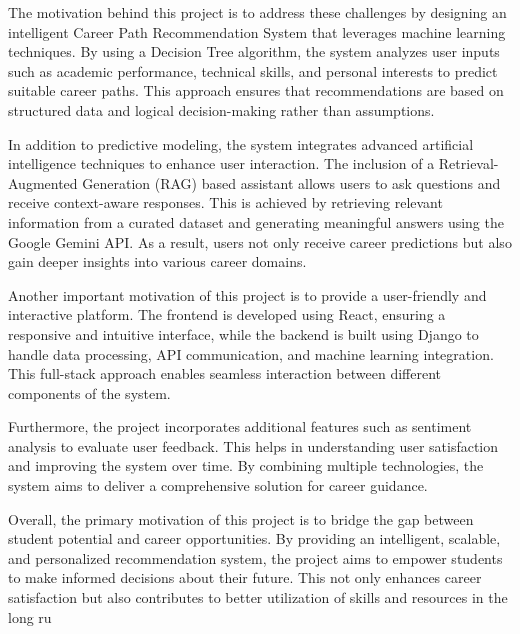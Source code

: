 \documentclass[12pt,a4paper]{report}
\begin{document}
{The motivation behind this project is to address these challenges by designing an intelligent Career Path Recommendation System that leverages machine learning techniques. By using a Decision Tree algorithm, the system analyzes user inputs such as academic performance, technical skills, and personal interests to predict suitable career paths. This approach ensures that recommendations are based on structured data and logical decision-making rather than assumptions.

In addition to predictive modeling, the system integrates advanced artificial intelligence techniques to enhance user interaction. The inclusion of a Retrieval-Augmented Generation (RAG) based assistant allows users to ask questions and receive context-aware responses. This is achieved by retrieving relevant information from a curated dataset and generating meaningful answers using the Google Gemini API. As a result, users not only receive career predictions but also gain deeper insights into various career domains.

Another important motivation of this project is to provide a user-friendly and interactive platform. The frontend is developed using React, ensuring a responsive and intuitive interface, while the backend is built using Django to handle data processing, API communication, and machine learning integration. This full-stack approach enables seamless interaction between different components of the system.

Furthermore, the project incorporates additional features such as sentiment analysis to evaluate user feedback. This helps in understanding user satisfaction and improving the system over time. By combining multiple technologies, the system aims to deliver a comprehensive solution for career guidance.

Overall, the primary motivation of this project is to bridge the gap between student potential and career opportunities. By providing an intelligent, scalable, and personalized recommendation system, the project aims to empower students to make informed decisions about their future. This not only enhances career satisfaction but also contributes to better utilization of skills and resources in the long ru



}
\end{document}
